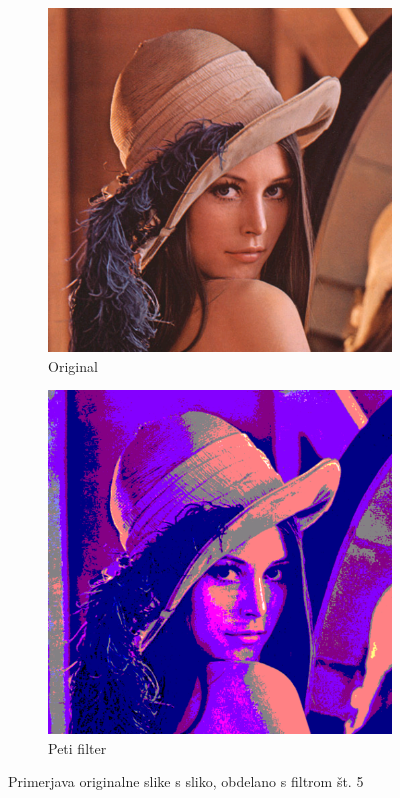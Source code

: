 \documentclass[a4paper, 12pt]{book}
\begin{document}
\begin{figure}[!ht]
    \centering
    \begin{subfigure}[b]{0.4\textwidth}
        \includegraphics[width=\textwidth]{lena}
        \caption{Original}
    \end{subfigure}
    \begin{subfigure}[b]{0.4\textwidth}
        \includegraphics[width=\textwidth]{lena_filter_5}
        \caption{Peti filter}
    \end{subfigure}
    \caption{Primerjava originalne slike s sliko, obdelano s filtrom št. 5}
    \label{fig:lena_filter_5}
\end{figure}
\end{document}

